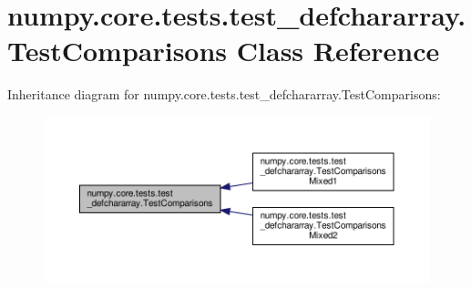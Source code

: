 \hypertarget{classnumpy_1_1core_1_1tests_1_1test__defchararray_1_1TestComparisons}{}\section{numpy.\+core.\+tests.\+test\+\_\+defchararray.\+Test\+Comparisons Class Reference}
\label{classnumpy_1_1core_1_1tests_1_1test__defchararray_1_1TestComparisons}


Inheritance diagram for numpy.\+core.\+tests.\+test\+\_\+defchararray.\+Test\+Comparisons\+:
\nopagebreak
\begin{figure}[H]
\begin{center}
\leavevmode
\includegraphics[width=350pt]{classnumpy_1_1core_1_1tests_1_1test__defchararray_1_1TestComparisons__inherit__graph}
\end{center}
\end{figure}
